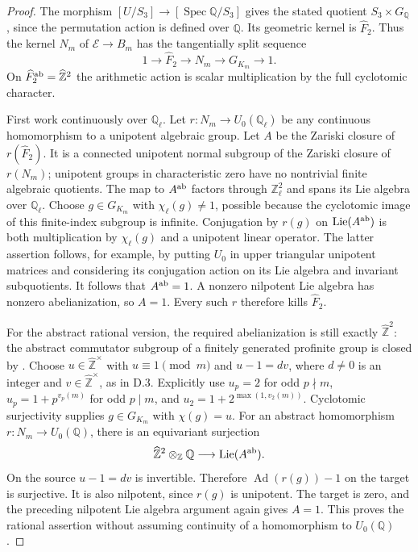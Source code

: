 \begin{proof}
The morphism $[U/S_3]\to[\operatorname{Spec}\mathbb Q/S_3]$
gives the stated quotient $S_3\times G_{\mathbb Q}$, since the
permutation action is defined over $\mathbb Q$. Its geometric
kernel is $\widehat F_2$. Thus the kernel $N_m$ of
$\mathcal E\to B_m$ has the tangentially split sequence
\[
 1\longrightarrow\widehat F_2\longrightarrow N_m
 \longrightarrow G_{K_m}\longrightarrow1.
\]
On $\widehat F_2^{\rm ab}=\widehat{\mathbb Z}^2$ the arithmetic
action is scalar multiplication by the full cyclotomic character.

First work continuously over $\mathbb Q_\ell$.
Let $r:N_m\to U_0(\mathbb Q_\ell)$ be any continuous homomorphism
to a unipotent algebraic group. Let $A$ be the Zariski closure of
$r(\widehat F_2)$. It is a connected unipotent normal subgroup
of the Zariski closure of $r(N_m)$; unipotent groups in characteristic
zero have no nontrivial finite algebraic quotients.
The map to $A^{\rm ab}$ factors through
$\mathbb Z_\ell^2$ and spans its Lie algebra over $\mathbb Q_\ell$.
Choose $g\in G_{K_m}$ with $\chi_\ell(g)\ne1$, possible because
the cyclotomic image of this finite-index subgroup is infinite.
Conjugation by $r(g)$ on $\operatorname{Lie}(A^{\rm ab})$
is both multiplication by $\chi_\ell(g)$ and a unipotent linear
operator. The latter assertion follows, for example, by putting
$U_0$ in upper triangular unipotent matrices and considering its
conjugation action on its Lie algebra and invariant subquotients.
It follows that $A^{\rm ab}=1$. A nonzero nilpotent Lie algebra
has nonzero abelianization, so $A=1$. Every such $r$ therefore
kills $\widehat F_2$.

For the abstract rational version, the required abelianization
is still exactly $\widehat{\mathbb Z}^2$: the abstract commutator
subgroup of a finitely generated profinite group is closed by
\cite[Theorem1.4]{dNikolovSegal2007}.
Choose $u\in\widehat{\mathbb Z}^{\times}$ with $u\equiv1\pmod m$
and $u-1=dv$, where $d\ne0$ is an integer and
$v\in\widehat{\mathbb Z}^{\times}$, as in D.3.
Explicitly use $u_p=2$ for odd $p\nmid m$,
$u_p=1+p^{v_p(m)}$ for odd $p\mid m$, and
$u_2=1+2^{\max(1,v_2(m))}$.
Cyclotomic surjectivity supplies $g\in G_{K_m}$ with $\chi(g)=u$.
For an abstract homomorphism $r:N_m\to U_0(\mathbb Q)$, there is
an equivariant surjection
\[
 \widehat{\mathbb Z}^2\otimes_{\mathbb Z}\mathbb Q
 \longrightarrow\operatorname{Lie}(A^{\rm ab}).
\]
On the source $u-1=dv$ is invertible. Therefore
$\operatorname{Ad}(r(g))-1$ on the target is surjective. It is
also nilpotent, since $r(g)$ is unipotent. The target is zero,
and the preceding nilpotent Lie algebra argument again gives $A=1$.
This proves the rational assertion without assuming continuity
of a homomorphism to $U_0(\mathbb Q)$.


\end{proof}
